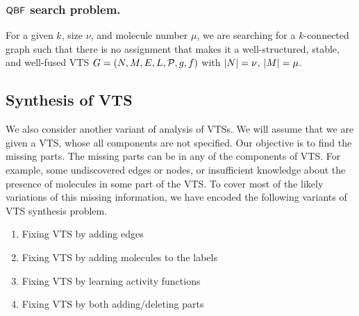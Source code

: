 \subsubsection{$\mathsf{QBF}$ search problem.} For a given $k$, size $\nu$, and molecule number $\mu$, we are searching for a $k$-connected graph such that there is no assignment that makes it a well-structured, stable, and well-fused VTS $G = (N,M,E,L,\mathcal{P},g,f)$ with $|N| = \nu$, $|M| = \mu$.    

%

\subsection{Synthesis of VTS}
%
We also consider another variant of analysis of VTSs.
%
We will assume that we are given a VTS, whose all components
are not specified.
%
Our objective is to find the missing parts.
%
The missing parts can be in any of the components of VTS. 
%
For example, some undiscovered edges or nodes, or insufficient
knowledge about the presence of molecules in some part of the VTS.
%
To cover most of the likely variations of this missing information,
we have encoded the following variants of VTS synthesis problem.

\begin{enumerate}
	\item Fixing VTS by adding edges 
	\item Fixing VTS by adding molecules to the labels
	\item Fixing VTS by learning activity functions
	\item  Fixing VTS by both adding/deleting parts
\end{enumerate}

